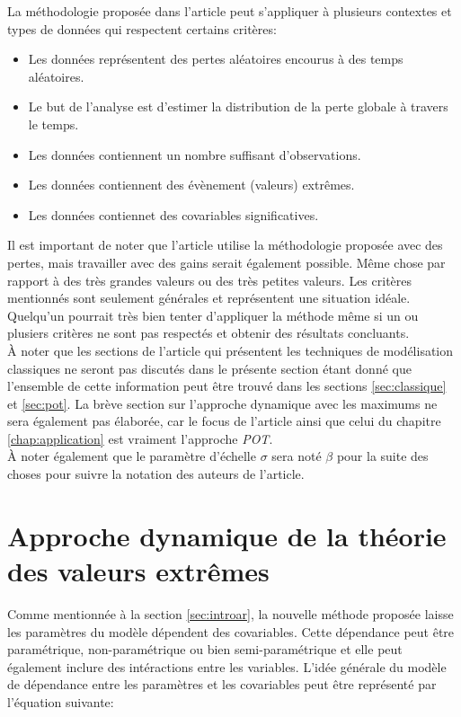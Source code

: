La méthodologie proposée dans l'article peut s'appliquer à plusieurs contextes et types de données qui respectent certains critères:
\begin{itemize}
\item Les données représentent des pertes aléatoires encourus à des temps aléatoires.
\item Le but de l'analyse est d'estimer la distribution de la perte globale à travers le temps.
\item Les données contiennent un nombre suffisant d'observations.
\item Les données contiennent des évènement (valeurs) extrêmes.
\item Les données contiennet des covariables significatives.
\end{itemize}

Il est important de noter que l'article utilise la méthodologie proposée avec des pertes, mais travailler avec des gains serait également possible. Même chose par rapport à des très grandes valeurs ou des très petites valeurs. Les critères mentionnés sont seulement générales et représentent une situation idéale. Quelqu'un pourrait très bien tenter d'appliquer la méthode même si un ou plusiers critères ne sont pas respectés et obtenir des résultats concluants. 
\\

À noter que les sections de l'article qui présentent les techniques de modélisation classiques ne seront pas discutés dans le présente section étant donné que l'ensemble de cette information peut être trouvé dans les sections \ref{sec:classique} et \ref{sec:pot}. La brève section sur l'approche dynamique avec les maximums ne sera également pas élaborée, car le focus de l'article ainsi que celui du chapitre \ref{chap:application} est vraiment l'approche \textit{POT}. 
\\

À noter également que le paramètre d'échelle $\sigma$ sera noté $\beta$ pour la suite des choses pour suivre la notation des auteurs de l'article.

\section{Approche dynamique de la théorie des valeurs extrêmes}

Comme mentionnée à la section \ref{sec:introar}, la nouvelle méthode proposée laisse les paramètres du modèle dépendent des covariables. Cette dépendance peut être paramétrique, non-paramétrique ou bien semi-paramétrique et elle peut également inclure des intéractions entre les variables. L'idée générale du modèle de dépendance entre les paramètres et les covariables peut être représenté par l'équation suivante:

